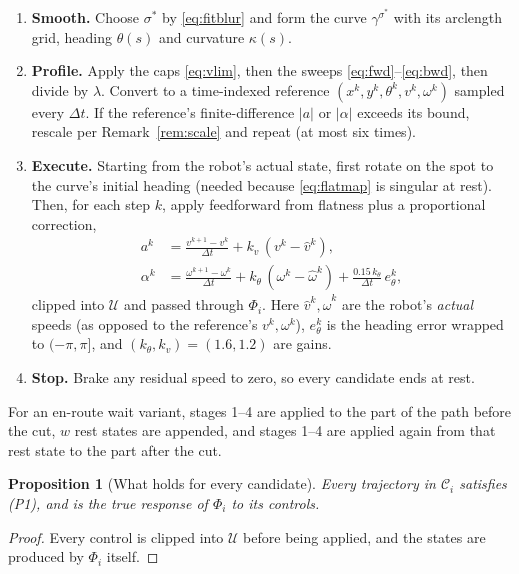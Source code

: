 \documentclass[conference]{IEEEtran}
\theoremstyle{plain}
\newtheorem{proposition}{Proposition}
\theoremstyle{definition}
\newcommand{\Cand}{\mathcal{C}}
\newcommand{\Uc}{\mathcal{U}}
\begin{document}
\begin{enumerate}
  \item \textbf{Smooth.} Choose $\sigma^\ast$ by \eqref{eq:fitblur} and form the curve
        $\gamma^{\sigma^\ast}$ with its arclength grid, heading $\theta(s)$ and curvature
        $\kappa(s)$.
  \item \textbf{Profile.} Apply the caps \eqref{eq:vlim}, then the sweeps
        \eqref{eq:fwd}--\eqref{eq:bwd}, then divide by $\lambda$. Convert to a time-indexed
        reference $(x^k, y^k, \theta^k, v^k, \omega^k)$ sampled every $\Delta t$. If the
        reference's finite-difference $|a|$ or $|\alpha|$ exceeds its bound, rescale per
        Remark~\ref{rem:scale} and repeat (at most six times).
  \item \textbf{Execute.} Starting from the robot's actual state, first rotate on the spot
        to the curve's initial heading (needed because \eqref{eq:flatmap} is singular at
        rest). Then, for each step $k$, apply feedforward from flatness plus a proportional
        correction,
        \begin{align}
          a^k &= \frac{v^{k+1}-v^k}{\Delta t} + k_v\,(v^k - \hat v^k), \label{eq:ff-a}\\
          \alpha^k &= \frac{\omega^{k+1}-\omega^k}{\Delta t}
                      + k_\theta\,(\omega^k - \hat\omega^k)
                      + \frac{0.15\,k_\theta}{\Delta t}\, e_\theta^k, \label{eq:ff-al}
        \end{align}
        clipped into $\Uc$ and passed through $\Phi_i$. Here $\hat v^k,\hat\omega^k$ are
        the robot's \emph{actual} speeds (as opposed to the reference's $v^k,\omega^k$),
        $e_\theta^k$ is the heading error wrapped to $(-\pi,\pi]$, and
        $(k_\theta, k_v) = (1.6, 1.2)$ are gains.
  \item \textbf{Stop.} Brake any residual speed to zero, so every candidate ends at rest.
\end{enumerate}
For an en-route wait variant, stages 1--4 are applied to the part of the path before the cut,
$w$ rest states are appended, and stages 1--4 are applied again from that rest state to the
part after the cut.

\begin{proposition}[What holds for every candidate]
\label{prop:admissible}
Every trajectory in $\Cand_i$ satisfies (P1), and is the true response of $\Phi_i$ to its
controls.
\end{proposition}

\begin{proof}
Every control is clipped into $\Uc$ before being applied, and the states are produced by
$\Phi_i$ itself.
\end{proof}
\end{document}
